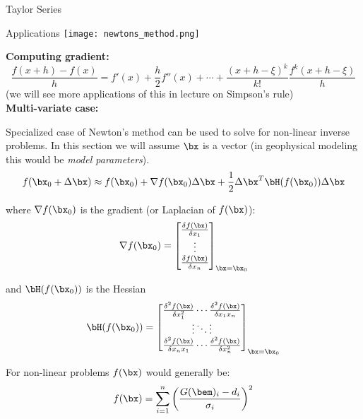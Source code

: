 \documentclass[11pt,titlepage,fleqn]{article}
\begin{document}
\begin{section}{Taylor Series}
\begin{subsection}{Applications}
\texttt{[image: newtons\_method.png]}

{\bf Computing gradient:}
\begin{equation}
\frac{f(x+h) - f(x)}{h} = f'(x) + \frac{h}{2} f''(x) + \cdots + \frac{(x+h-\xi)^k}{k!} \frac{f^k (x+h-\xi)}{h}
\end{equation}
(we will see more applications of this in lecture on Simpson's rule)\\

{\bf Multi-variate case:}

Specialized case of Newton's method can be used to solve for non-linear inverse problems. In this section we will assume $\bx$ is a vector (in geophysical modeling this would be {\it model parameters}).
\begin{equation}
f(\bx_0 + \Delta \bx) \approx f(\bx_0) + \nabla f(\bx_0) \Delta \bx + \frac{1}{2} \Delta \bx^T \bH(f(\bx_0)) \Delta \bx 
\end{equation}

where $\nabla f(\bx_0)$ is the gradient (or Laplacian of $f(\bx)$):
\begin{equation}
\nabla f(\bx_0) = 
\begin{bmatrix} 
\frac{\delta f(\bx)}{\delta x_1}\\
\vdots \\
\frac{\delta f(\bx)}{\delta x_n}\\
\end{bmatrix} _{\bx = \bx_0}
\end{equation}

and $\bH(f(\bx_0))$ is the Hessian
\begin{equation}
\bH(f(\bx_0)) = 
\begin{bmatrix} 
\frac{\delta^2 f(\bx)}{\delta x_1^2} \cdots \frac{\delta^2 f(\bx)}{\delta x_1 x_n}\\
\vdots \ddots \vdots \\
\frac{\delta^2 f(\bx)}{\delta x_n x_1} \cdots \frac{\delta^2 f(\bx)}{\delta x_n^2}\\
\end{bmatrix} _{\bx = \bx_0}
\end{equation}

For non-linear problems $f(\bx)$ would generally be:
\begin{equation}
f(\bx) = \sum_{i=1}^n \left ( \frac{G(\bem)_i - d_i}{\sigma_i} \right )^2
\end{equation}

\end{subsection}

\end{section}
\end{document}
